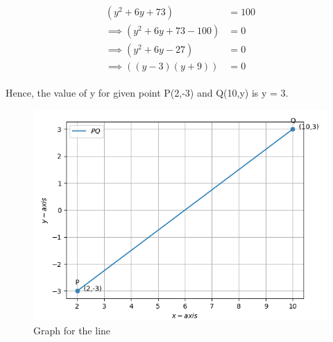 \documentclass[12pt]{article}
\providecommand{\brak}[1]{\ensuremath{\left(#1\right)}}
\begin{document}
\begin{enumerate}
    \begin{align}
	\begin{split}	                     
	\brak{y^2 + 6y + 73}&=100 \\
	\implies  
	\brak{y^2 + 6y + 73 - 100}& = 0 \\
	\implies 
	\brak{y^2 + 6y - 27}& = 0\\
    \implies
    \brak{(y-3)(y+9)}& = 0	
    \end{split}
    \end{align}
	
	
    Hence, the value of y for given point P(2,-3) and Q(10,y) is y = 3.	
\hspace{3mm}
\begin{figure}[!h]
	\begin{center}
	\includegraphics[width=6in]{graph.png}	
	\end{center}
		
\caption{Graph for the line}
\label{fig:Fig}
\end{figure}
\end{enumerate}
\end{document}
